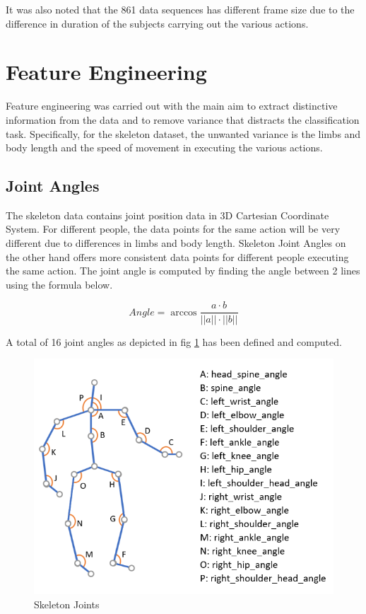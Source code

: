 \documentclass[conference]{IEEEtran}
\begin{document}
It was also noted that the 861 data sequences has different frame size due to the difference in duration of the subjects carrying out the various actions. 

\section{Feature Engineering}

Feature engineering was carried out with the main aim to
extract distinctive information from the data and to
remove variance that distracts the classification task.
Specifically, for the skeleton dataset, the unwanted
variance is the limbs and body length and the speed of
movement in executing the various actions. 

\subsection{Joint Angles}
The skeleton data contains joint position data in 3D
Cartesian Coordinate System. For different people, the
data points for the same action will be very different due
to differences in limbs and body length. Skeleton Joint Angles on the other hand offers more consistent data points for
different people executing the same action. The joint
angle is computed by finding the angle between 2 lines using the formula below.

\begin{equation}
Angle = \arccos{\frac{a\cdot b}{||a|| \cdot ||b||}}
\end{equation}


A total of 16 joint angles as depicted in fig \ref{fig:SkeletonJoints} has been defined and computed.

\begin{figure}[H]
\begin{center}
\includegraphics[scale=0.6]{Image/Skeleton_Joints.png}
\caption{\label{fig:SkeletonJoints} Skeleton Joints}
\end{center}
\end{figure}
\end{document}
